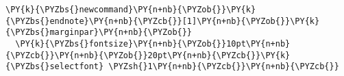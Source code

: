 \begin{Verbatim}[commandchars=\\\{\}]
\PY{k}{\PYZbs{}newcommand}\PY{n+nb}{\PYZob{}}\PY{k}{\PYZbs{}endnote}\PY{n+nb}{\PYZcb{}}[1]\PY{n+nb}{\PYZob{}}\PY{k}{\PYZbs{}marginpar}\PY{n+nb}{\PYZob{}}
  \PY{k}{\PYZbs{}fontsize}\PY{n+nb}{\PYZob{}}10pt\PY{n+nb}{\PYZcb{}}\PY{n+nb}{\PYZob{}}20pt\PY{n+nb}{\PYZcb{}}\PY{k}{\PYZbs{}selectfont} \PYZsh{}1\PY{n+nb}{\PYZcb{}}\PY{n+nb}{\PYZcb{}}
\end{Verbatim}
